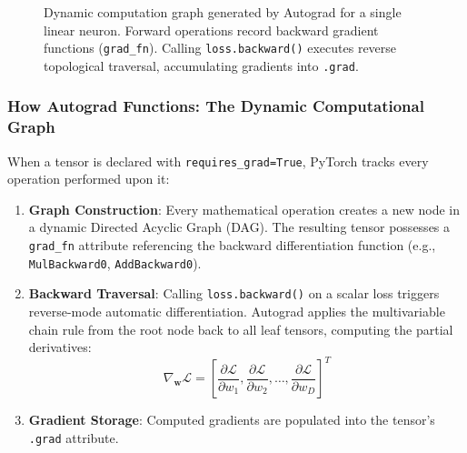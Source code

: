 \begin{figure}[htbp]
\caption{Dynamic computation graph generated by Autograd for a single linear neuron. Forward operations record backward gradient functions (\texttt{grad\_fn}). Calling \texttt{loss.backward()} executes reverse topological traversal, accumulating gradients into \texttt{.grad}.}\label{fig:autograd_graph}
\end{figure}

\subsubsection{How Autograd Functions: The Dynamic Computational Graph}

When a tensor is declared with \texttt{requires\_grad=True}, PyTorch tracks every operation performed upon it:
\begin{enumerate}
    \item \textbf{Graph Construction}: Every mathematical operation creates a new node in a dynamic Directed Acyclic Graph (DAG). The resulting tensor possesses a \texttt{grad\_fn} attribute referencing the backward differentiation function (e.g., \texttt{MulBackward0}, \texttt{AddBackward0}).
    \item \textbf{Backward Traversal}: Calling \texttt{loss.backward()} on a scalar loss triggers reverse-mode automatic differentiation. Autograd applies the multivariable chain rule from the root node back to all leaf tensors, computing the partial derivatives:
    \begin{equation}
    \nabla_{\mathbf{w}} \mathcal{L} = \left[ \frac{\partial \mathcal{L}}{\partial w_1}, \frac{\partial \mathcal{L}}{\partial w_2}, \dots, \frac{\partial \mathcal{L}}{\partial w_D} \right]^T\label{eq:gradient_vector}
    \end{equation}
    \item \textbf{Gradient Storage}: Computed gradients are populated into the tensor's \texttt{.grad} attribute.
\end{enumerate}

